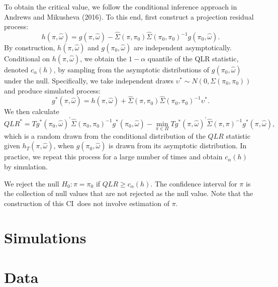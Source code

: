 \documentclass[11pt, letterpaper, twoside, final]{article}
\begin{document}
To obtain the critical value, we follow the conditional inference approach in Andrews and Mikusheva (2016). To
this end, first construct a projection residual process:
%
\begin{equation}
    h(\pi ,\widehat{\omega})=g(\pi ,\widehat{\omega})-\widehat{\Sigma}(\pi ,\pi_{0})\widehat{\Sigma
   }(\pi_{0},\pi_{0})^{-1}g(\pi_{0},\widehat{\omega}).
\end{equation}
%
By construction, $h(\pi ,\widehat{\omega})$ and $g(\pi_{0},\widehat{\omega})$ are independent asymptotically. 
Conditional on $h(\pi ,\widehat{\omega})$, we obtain the $1-\alpha $ quantile of the QLR statistic, denoted
$c_{\alpha}(h)$, by sampling from the asymptotic distributions of $g(\pi_{0},\widehat{\omega})$ under the null.
Specifically, we take independent draws $\upsilon^{\ast}\sim N(0,\Sigma (\pi_{0},\pi_{0}))$ and produce simulated
process:
%
\begin{equation}
    g^{\ast}(\pi ,\widehat{\omega}) = h\left(\pi ,\widehat{\omega}\right) + \widehat{\Sigma} (\pi
    ,\pi_{0})\widehat{\Sigma}(\pi_{0},\pi_{0})^{-1}\upsilon^{\ast}.
\end{equation}%
%
We then calculate
\begin{equation}
    QLR^{\ast}=Tg^{\ast}(\pi_{0},\widehat{\omega})^{\prime}\widehat{\Sigma} (\pi_{0},\pi_{0})^{-1}g^{\ast
   }(\pi_{0},\widehat{\omega})-\underset{\pi \in \Pi}{\min}Tg^{\ast}(\pi ,\widehat{\omega})^{\prime
   }\widehat{\Sigma} (\pi ,\pi )^{-1}g^{\ast}(\pi ,\widehat{\omega}), 
\end{equation}
%
which is a random drawn from the conditional distribution of the $QLR$ statistic given $h_{T}(\pi ,\widehat{\omega
})$, when $g(\pi_{0},\widehat{ \omega})$ is drawn from its asymptotic distribution. 
In practice, we repeat this process for a large number of times and obtain $c_{\alpha}(h)$ by simulation.

We reject the null $H_{0}:\pi =\pi_{0}$ if $QLR\geq c_{\alpha}(h)$. 
The confidence interval for $\pi $ is the collection of null values that are not rejected as the null value. 
Note that the construction of this CI\ does not involve estimation of $\pi$.

\section{Simulations}

\section{Data}\label{sec:data}
\end{document}
